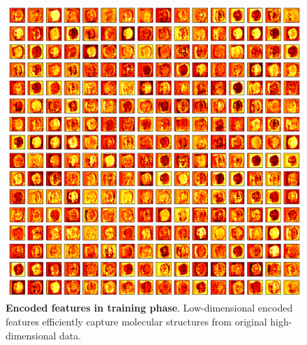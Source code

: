 \documentclass{WileyMSP-template}
\begin{document}
\begin{figure}[htbp]
  \includegraphics[width=\textwidth]{pic/encoder_feature_3D_train.png}
  \captionsetup{justification=raggedright,singlelinecheck=false}
  \caption
  {
    \textbf{Encoded features in training phase}. 
    Low-dimensional encoded features 
    efficiently capture molecular structures 
    from original high-dimensional data. 
  }
  \label{fig:encoder_feature_3D_train}
\end{figure}
\end{document}
